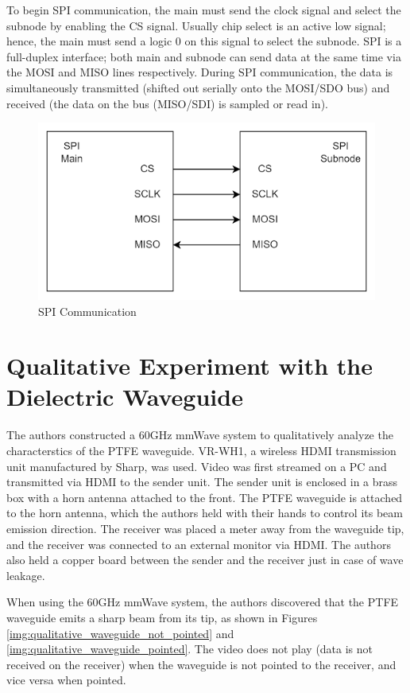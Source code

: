\documentclass[a4paper,12pt]{report}
\begin{document}
To begin SPI communication,
the main must send the clock signal and select the subnode
by enabling the CS signal.
Usually chip select is an active low signal; hence,
the main must send a logic 0 on this signal to select the subnode.
SPI is a full-duplex interface;
both main and subnode can send data at the same time
via the MOSI and MISO lines respectively.
During SPI communication,
the data is simultaneously transmitted
(shifted out serially onto the MOSI/SDO bus)
and received (the data on the bus (MISO/SDI) is sampled or read in).

\begin{figure}
  \begin{center}
    \includegraphics[clip, keepaspectratio, width=0.5\linewidth]{img/SPI_communication.png}
    \caption{SPI Communication}
    \label{fig:SPI_Communication}
  \end{center}
\end{figure}


\section{Qualitative Experiment with the Dielectric Waveguide}

The authors constructed a 60GHz mmWave system to
qualitatively analyze the characterstics of the PTFE waveguide.
VR-WH1, a wireless HDMI transmission unit manufactured by Sharp, was used.
Video was first streamed on a PC and transmitted via HDMI to the sender unit.
The sender unit is enclosed in a brass box with a horn antenna attached to the front.
The PTFE waveguide is attached to the horn antenna,
which the authors held with their hands to control
its beam emission direction.
The receiver was placed a meter away from the waveguide tip,
and the receiver was connected to an external monitor via HDMI.
The authors also held a copper board between the sender and the receiver
just in case of wave leakage.

When using the 60GHz mmWave system,
the authors discovered that the PTFE waveguide
emits a sharp beam from its tip,
as shown in Figures \ref{img:qualitative_waveguide_not_pointed}
and \ref{img:qualitative_waveguide_pointed}.
The video does not play (data is not received on the receiver)
when the waveguide is not pointed to the receiver,
and vice versa when pointed.
\end{document}
